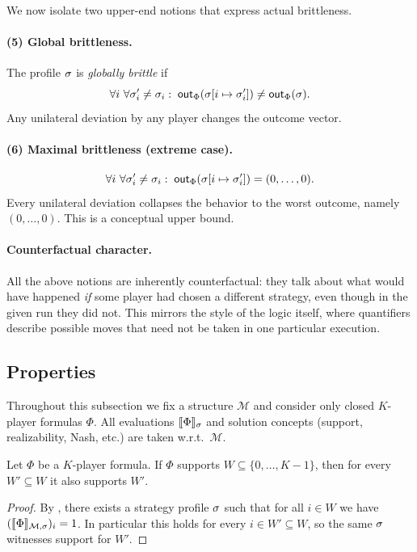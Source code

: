 \medskip
We now isolate two upper-end notions that express actual brittleness.

\paragraph{(5) Global brittleness.}
The profile $\sigma$ is \emph{globally brittle} if
\[
  \forall i\ \forall \profile_i' \ne \profile_i:\;
  \mathsf{out}_\Phi(\profile[i \mapsto \profile_i'])
  \ne
  \mathsf{out}_\Phi(\profile).
\]
Any unilateral deviation by any player changes the outcome vector.

\paragraph{(6) Maximal brittleness (extreme case).}
\[
  \forall i\ \forall \sigma_i' \ne \sigma_i:\;
  \mathsf{out}_\Phi(\sigma[i \mapsto \sigma_i']) = (0,\dots,0).
\]
Every unilateral deviation collapses the behavior to the worst outcome, namely
$(0,\dots,0)$. This is a conceptual upper bound.

\paragraph{Counterfactual character.}
All the above notions are inherently counterfactual: they talk about what would
have happened \emph{if} some player had chosen a different strategy, even though
in the given run they did not. This mirrors the style of the logic itself, where
quantifiers describe possible moves that need not be taken in one particular
execution.

\subsection{Properties}

Throughout this subsection we fix a structure $\mathcal M$ and consider only closed $K$-player formulas $\Phi$.
All evaluations $\llbracket \Phi \rrbracket_{\sigma}$ and solution concepts (support, realizability, Nash, etc.) are taken w.r.t.\ $\mathcal M$.

\begin{proposition}
\label{prop:support-downward}
Let $\Phi$ be a $K$-player formula. If $\Phi$ supports $W \subseteq \{0,\dots,K-1\}$, then for every $W' \subseteq W$ it also supports $W'$.
\end{proposition}
\begin{proof}
By , there exists a strategy profile $\sigma$ such that for all $i \in W$ we have $(\llbracket \Phi \rrbracket_{\mathcal M,\sigma})_i = 1$. In particular this holds for every $i \in W' \subseteq W$, so the same $\sigma$ witnesses support for $W'$.
\end{proof}

